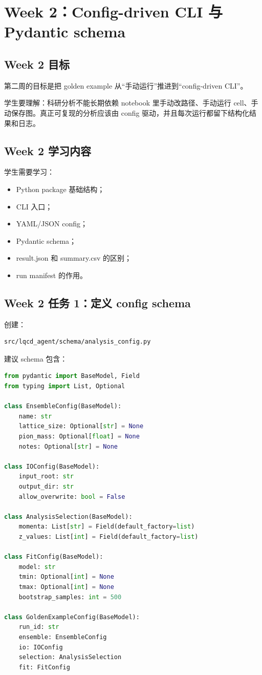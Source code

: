 \documentclass[11pt,a4paper,fontset=fandol]{ctexart}
\begin{document}
\section{Week 2：Config-driven CLI 与 Pydantic schema}

\subsection{Week 2 目标}

第二周的目标是把 golden example 从“手动运行”推进到“config-driven CLI”。

学生要理解：科研分析不能长期依赖 notebook 里手动改路径、手动运行 cell、手动保存图。真正可复现的分析应该由 config 驱动，并且每次运行都留下结构化结果和日志。

\subsection{Week 2 学习内容}

学生需要学习：

\begin{itemize}[leftmargin=2em]
  \item Python package 基础结构；
  \item CLI 入口；
  \item YAML/JSON config；
  \item Pydantic schema；
  \item result.json 和 summary.csv 的区别；
  \item run manifest 的作用。
\end{itemize}

\subsection{Week 2 任务 1：定义 config schema}

创建：

\begin{lstlisting}
src/lqcd_agent/schema/analysis_config.py
\end{lstlisting}

建议 schema 包含：

\begin{lstlisting}[language=Python]
from pydantic import BaseModel, Field
from typing import List, Optional

class EnsembleConfig(BaseModel):
    name: str
    lattice_size: Optional[str] = None
    pion_mass: Optional[float] = None
    notes: Optional[str] = None

class IOConfig(BaseModel):
    input_root: str
    output_dir: str
    allow_overwrite: bool = False

class AnalysisSelection(BaseModel):
    momenta: List[str] = Field(default_factory=list)
    z_values: List[int] = Field(default_factory=list)

class FitConfig(BaseModel):
    model: str
    tmin: Optional[int] = None
    tmax: Optional[int] = None
    bootstrap_samples: int = 500

class GoldenExampleConfig(BaseModel):
    run_id: str
    ensemble: EnsembleConfig
    io: IOConfig
    selection: AnalysisSelection
    fit: FitConfig
\end{lstlisting}
\end{document}
